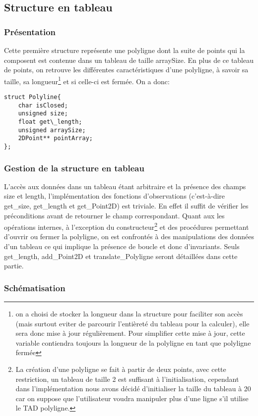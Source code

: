 \documentclass[a4paper, 11pt, oneside]{article}
\begin{document}
\subsection{Structure en tableau}

\subsubsection{Présentation}\label{presentation}
Cette première  structure représente une polyligne dont la suite de points qui la composent est contenue dans un tableau de taille arraySize. En plus de ce tableau de points, on retrouve les différentes caractéristiques d'une polyligne, à savoir sa taille, sa longueur\footnote{on a choisi de stocker la longueur dans la structure pour faciliter son accès (mais surtout eviter de parcourir l'entièreté du tableau pour la calculer), elle sera donc mise à jour régulièrement. Pour simplifier cette mise à jour, cette variable contiendra toujours la longueur de la polyligne en tant que polyligne fermée} et si celle-ci est fermée. On a donc:
\begin{lstlisting}
struct Polyline{
	char isClosed;
	unsigned size;
	float get\_length;
	unsigned arraySize;
	2DPoint** pointArray;
};
\end{lstlisting}

\subsubsection{Gestion de la structure en tableau}
L'accès aux données dans un tableau étant arbitraire et la présence des champs size et length, l'implémentation des fonctions d'observations (c'est-à-dire get\_size, get\_length et get\_Point2D) est triviale. En effet il suffit de vérifier les préconditions avant de retourner le champ correspondant. Quant aux les opérations internes, à l'exception du constructeur\footnote{La création d'une polyligne se fait à partir de deux points, avec cette restriction, un tableau de taille 2 est suffisant à l'initialisation, cependant dans l'implémentation nous avons décidé d'initialiser la taille du tableau à 20 car on suppose que l'utilisateur voudra manipuler plus d'une ligne s'il utilise le TAD polyligne.} et des procédures permettant d'ouvrir ou fermer la polyligne, on est confrontés à des manipulations des données d'un tableau ce qui implique la présence de boucle et donc d'invariants. Seuls get\_length, add\_Point2D et translate\_Polyligne seront détaillées dans cette partie.

\subsubsection{Schématisation}
\end{document}

